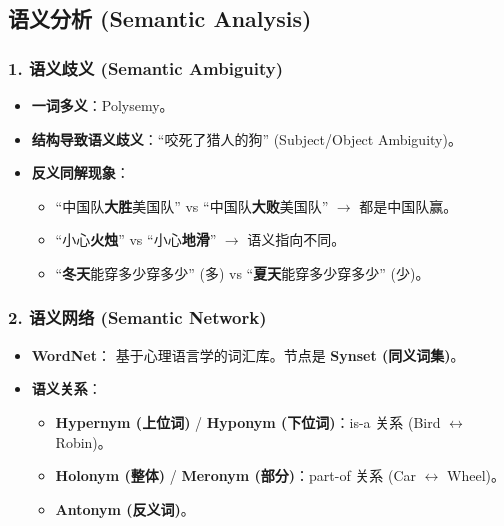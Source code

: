 \documentclass[a4paper, 11pt]{ctexart}
\begin{document}
\subsection{语义分析 (Semantic Analysis)}

\subsubsection{1. 语义歧义 (Semantic Ambiguity)}
\begin{itemize}
    \item \textbf{一词多义}：Polysemy。
    \item \textbf{结构导致语义歧义}：“咬死了猎人的狗” (Subject/Object Ambiguity)。
    \item \textbf{反义同解现象}：
    \begin{itemize}
        \item “中国队\textbf{大胜}美国队” vs “中国队\textbf{大败}美国队” $\to$ 都是中国队赢。
        \item “小心\textbf{火烛}” vs “小心\textbf{地滑}” $\to$ 语义指向不同。
        \item “\textbf{冬天}能穿多少穿多少” (多) vs “\textbf{夏天}能穿多少穿多少” (少)。
    \end{itemize}
\end{itemize}

\subsubsection{2. 语义网络 (Semantic Network)}
\begin{itemize}
    \item \textbf{WordNet}：
    基于心理语言学的词汇库。节点是 \textbf{Synset (同义词集)}。
    \item \textbf{语义关系}：
    \begin{itemize}
        \item \textbf{Hypernym (上位词)} / \textbf{Hyponym (下位词)}：is-a 关系 (Bird $\leftrightarrow$ Robin)。
        \item \textbf{Holonym (整体)} / \textbf{Meronym (部分)}：part-of 关系 (Car $\leftrightarrow$ Wheel)。
        \item \textbf{Antonym (反义词)}。
    \end{itemize}
\end{itemize}
\end{document}
